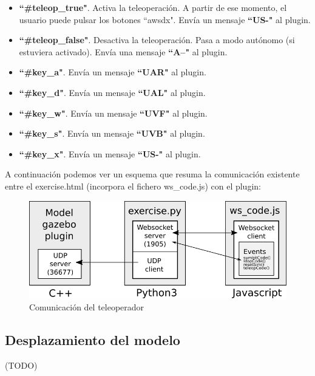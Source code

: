 \begin{itemize}
	\item \textbf{``\#teleop\_true"}. Activa la teleoperación. A partir de ese momento, el usuario puede pulsar los botones ``awsdx". Envía un mensaje \textbf{``US-"} al plugin.
	\item \textbf{``\#teleop\_false"}. Desactiva la teleoperación. Pasa a modo autónomo (si estuviera activado). Envía una mensaje \textbf{``A--"} al plugin.
	\item \textbf{``\#key\_a"}. Envía un mensaje \textbf{``UAR"} al plugin.
	\item \textbf{``\#key\_d"}. Envía un mensaje \textbf{``UAL"} al plugin.
	\item \textbf{``\#key\_w"}. Envía un mensaje \textbf{``UVF"} al plugin.
	\item \textbf{``\#key\_s"}. Envía un mensaje \textbf{``UVB"} al plugin.
	\item \textbf{``\#key\_x"}. Envía un mensaje \textbf{``US-"} al plugin.
\end{itemize}

A continuación podemos ver un esquema que resuma la comunicación existente entre el exercise.html (incorpora el fichero ws\_code.js) con el plugin:

\begin{figure} [H]
  \begin{center}
    \includegraphics[width=15cm]{imagenes/comunicacion-teleoperador.png}
  \end{center}
  \caption[Comunicación del teleoperador]{Comunicación del teleoperador}
  \label{fig:comunicacion_teleoperador}
\end{figure}

\subsection{Desplazamiento del modelo}
\label{subsec:desplazamiento_modelo}
(TODO)




